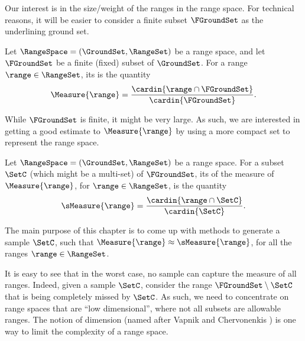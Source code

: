 Our interest is in the size/weight of the ranges in the range
space. For technical reasons, it will be easier to consider a finite
subset $\FGroundSet$ as the underlining ground set.

\begin{defn}
    Let $\RangeSpace = (\GroundSet,\RangeSet)$ be a range space, and
    let $\FGroundSet$ be a finite (fixed) subset of $\GroundSet$. For
    a range $\range \in \RangeSet$, its  is the
    quantity
    \begin{equation*}
        \Measure{\range}%
        =%
        \frac{\cardin{\range \cap \FGroundSet}}{\cardin{\FGroundSet}}.
    \end{equation*}
\end{defn}

While $\FGroundSet$ is finite, it might be very large. As such, we are
interested in getting a good estimate to $\Measure{\range}$ by using a
more compact set to represent the range space.

\begin{defn}
    Let $\RangeSpace = (\GroundSet,\RangeSet)$ be a range space.  For
    a subset $\SetC$ (which might be a multi-set) of $\FGroundSet$,
    its  of the measure of $\Measure{\range}$, for
    $\range \in \RangeSet$, is the quantity
    \begin{align*}
      \sMeasure{\range}%
      =%
      \frac{\cardin{\range \cap \SetC}}{\cardin{\SetC}}.
    \end{align*}
\end{defn}

The main purpose of this chapter is to come up with methods to
generate a sample $\SetC$, such that $\Measure{\range} \approx
\sMeasure{\range}$, for all the ranges $\range \in \RangeSet$.

It is easy to see that in the worst case, no sample can capture the
measure of all ranges.  Indeed, given a sample $\SetC$, consider the
range $\FGroundSet \setminus \SetC$ that is being completely missed by
$\SetC$.  As such, we need to concentrate on range spaces that are
``low dimensional'', where not all subsets are allowable ranges. The
notion of \VC dimension (named after Vapnik and Chervonenkis
\cite{vc-ucrfe-71}) is one way to limit the complexity of a range
space.


